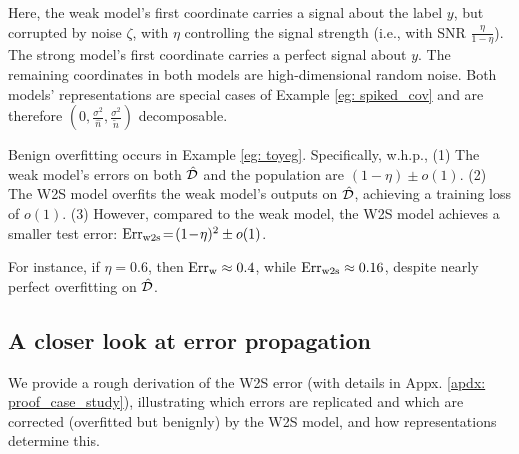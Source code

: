 Here, the weak model's first coordinate carries a signal about the label $y$, but corrupted by noise $\zeta$, with $\eta$ controlling the signal strength (i.e., with SNR $\frac{\eta}{1-\eta}$). The strong model's first coordinate carries a perfect signal about $y$. The remaining coordinates in both models are high-dimensional random noise. Both models' representations are special cases of Example \ref{eg: spiked_cov} and are therefore $(0, \frac{\sigma^2}{\hat{n}}, \frac{\sigma^2}{\tilde{n}})$  decomposable.  

\begin{corollary}\label{coro: case_study}
Benign overfitting occurs in Example \ref{eg: toyeg}. Specifically, w.h.p., (1) The weak model's errors on both $\hat{{\mathcal{D}}}$ and the population are $(1\!- \!\eta) \!\pm\! o(1)$. (2) The W2S model overfits the weak model's outputs on $\hat{{\mathcal{D}}}$, achieving a training loss of $o(1)$. (3) However, compared to the weak model, the W2S model achieves a smaller test error: $\text{Err}_{\text{w2s}} \!=\! (1\! -\! \eta)^2 \pm o(1)$.
\end{corollary}
For instance, if $\eta\!=\!0.6$, then $\text{Err}_{\text{w}}\approx0.4$, while $\text{Err}_{\text{w2s}}\approx0.16$, despite nearly perfect overfitting on $\hat{{\mathcal{D}}}$. 

\subsection{A closer look at error propagation}

We provide a rough derivation of the W2S error (with  details in Appx. \ref{apdx: proof_case_study}), illustrating which errors are replicated and which are corrected (overfitted but benignly) by the W2S model, and how representations determine this.

